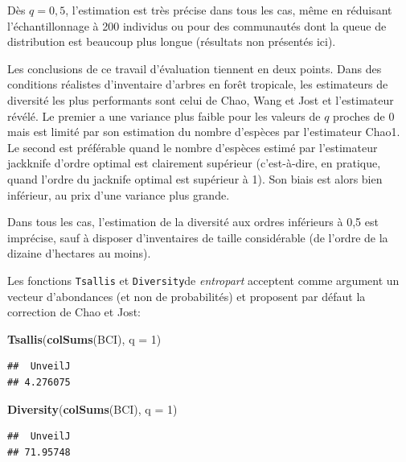 \documentclass[
  11pt,
  french,
  a4paper,
  extrafontsizes,onecolumn,openright
  ]{memoir}
\newenvironment{Shaded}{\begin{snugshade}}{\end{snugshade}}
\newcommand{\DataTypeTok}[1]{\textcolor[rgb]{0.13,0.29,0.53}{#1}}
\newcommand{\DecValTok}[1]{\textcolor[rgb]{0.00,0.00,0.81}{#1}}
\newcommand{\KeywordTok}[1]{\textcolor[rgb]{0.13,0.29,0.53}{\textbf{#1}}}
\newcommand{\NormalTok}[1]{#1}
\begin{document}
Dès \(q=0,5\), l'estimation est très précise dans tous les cas, même en réduisant l'échantillonnage à 200 individus ou pour des communautés dont la queue de distribution est beaucoup plus longue (résultats non présentés ici).

Les conclusions de ce travail d'évaluation tiennent en deux points.
Dans des conditions réalistes d'inventaire d'arbres en forêt tropicale, les estimateurs de diversité les plus performants sont celui de Chao, Wang et Jost et l'estimateur révélé.
Le premier a une variance plus faible pour les valeurs de \(q\) proches de 0 mais est limité par son estimation du nombre d'espèces par l'estimateur Chao1.
Le second est préférable quand le nombre d'espèces estimé par l'estimateur jackknife d'ordre optimal est clairement supérieur (c'est-à-dire, en pratique, quand l'ordre du jacknife optimal est supérieur à 1).
Son biais est alors bien inférieur, au prix d'une variance plus grande.

Dans tous les cas, l'estimation de la diversité aux ordres inférieurs à 0,5 est imprécise, sauf à disposer d'inventaires de taille considérable (de l'ordre de la dizaine d'hectares au moins).

Les fonctions \texttt{Tsallis} et \texttt{Diversity}de \emph{entropart} acceptent comme argument un vecteur d'abondances (et non de probabilités) et proposent par défaut la correction de Chao et Jost:

\scriptsize

\begin{Shaded}
\begin{Highlighting}[]
\KeywordTok{Tsallis}\NormalTok{(}\KeywordTok{colSums}\NormalTok{(BCI), }\DataTypeTok{q =} \DecValTok{1}\NormalTok{)}
\end{Highlighting}
\end{Shaded}

\begin{verbatim}
##  UnveilJ 
## 4.276075
\end{verbatim}

\begin{Shaded}
\begin{Highlighting}[]
\KeywordTok{Diversity}\NormalTok{(}\KeywordTok{colSums}\NormalTok{(BCI), }\DataTypeTok{q =} \DecValTok{1}\NormalTok{)}
\end{Highlighting}
\end{Shaded}

\begin{verbatim}
##  UnveilJ 
## 71.95748
\end{verbatim}
\end{document}
